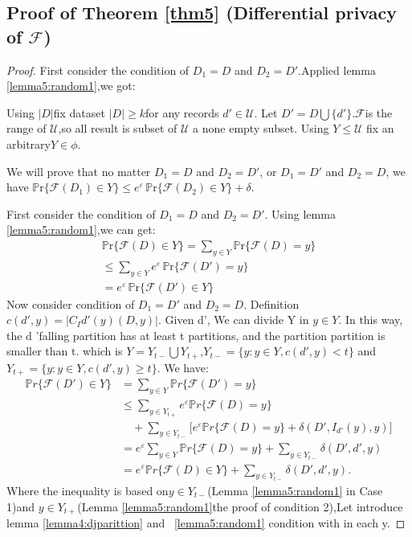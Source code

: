 \subsection{Proof of Theorem \ref{thm5} (Differential privacy of $\mathcal{F}$)}\label{thm5:proof}

\begin{proof}

First consider the condition of $D_1 = D$ and $D_2 = D'$.Applied lemma \ref{lemma5:random1},we got:


Using $|D|$fix dataset $|D|\geq k$for any records $d' \in \mathcal{U}$. Let $D'=D \bigcup \{d'\}$.$\mathcal{F}$is the range of $\mathcal{U}$,so all result is subset of $\mathcal{U}$ a none empty subset. Using $Y \leq \mathcal{U} $ fix an arbitrary$Y\in \phi $.

We will prove that no matter $D_1 = D$ and $D_2 = D'$, or $D_1 = D'$ and $D_2 = D$, we have $\mathbb{P}\mathrm{r}\{\mathcal{F}(D_1)\in Y\} \leq e^\varepsilon\,\mathbb{P}\mathrm{r}\{\mathcal{F}(D_2)\in Y\} + \delta$.


First consider the condition of $D_1 = D$ and $D_2 = D'$. Using lemma \ref{lemma5:random1},we can get:
    \begin{equation}
\begin{aligned}
\mathbb{P}\mathrm{r}\{\mathcal{F}(D)\in Y\} = \sum_{y\in Y} \mathbb{P}\mathrm{r}\{\mathcal{F}(D)=y\}  \\
\leq \sum_{y\in Y} e^{\varepsilon}\,\mathbb{P}\mathrm{r}\{\mathcal{F}(D')=y\}  \\
= e^{\varepsilon}\,\mathbb{P}\mathrm{r}\{\mathcal{F}(D')\in Y\}  
\end{aligned}
\end{equation}
Now consider condition of $D_1 = D'$ and $D_2 = D$. Definition $c(d',y)= | C_I d'(y)(D,y)|$. Given d', We can divide Y in $y\in Y$. In this way, the d 'falling partition has at least t partitions, and the partition partition is smaller than t. which is $Y = Y_{t-}\bigcup Y_{t+}$,$Y_{t-}= \{y:y\in Y,c(d',y)<t\}$ and $Y_{t+}= \{y:y\in Y,c(d',y)\geq t\}$. We have:
        {\footnotesize
    \begin{equation}
\begin{aligned}
\mathbb{P}r\{ \mathcal{F}(D') \in Y\}  &= \sum_{ y\in Y} \mathbb{P}r\{ \mathcal{F}(D') = y\}  \\
&\leq \sum_{ y\in Y_{t+}} e^{\varepsilon}\mathbb{P}r\{ \mathcal{F}(D) = y\} \\
&\quad + \sum_{ y\in Y_{t-}} \bigl[ e^{\varepsilon}\mathbb{P}r\{ \mathcal{F}(D) = y\} + \delta (D', I_{d'}(y),y) \bigr]  \\
&= e^{\varepsilon}\sum_{ y\in Y} \mathbb{P}r\{ \mathcal{F}(D) = y\} + \sum_{ y\in Y_{t-}} \delta (D', d',y) \\
&= e^{\varepsilon} \mathbb{P}r\{ \mathcal{F}(D) \in Y\} + \sum_{ y\in Y_{t-}} \delta (D', d',y). 	
\end{aligned}
\end{equation}
    }
Where the inequality is based on$ y\in Y_{t-} $(Lemma \ref{lemma5:random1} in Case 1)and $ y\in Y_{t+} $(Lemma \ref{lemma5:random1}the proof of condition 2),Let introduce lemma \ref{lemma4:djparittion} and ~\ref{lemma5:random1} condition with in each y.


\end{proof}
